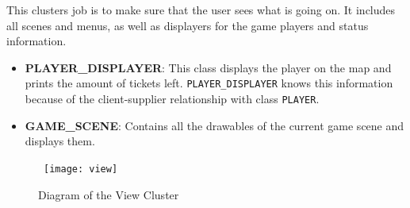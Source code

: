  This clusters job is to make sure that the user sees what is going on. It includes all scenes and menus, as well as displayers for the game players and status information.

\begin{itemize}
  \item{\textbf{PLAYER\_DISPLAYER}: This class displays the player on the map and prints the amount of tickets left. \texttt{PLAYER\_DISPLAYER} knows this information because of the client-supplier relationship with class \texttt{PLAYER}.}
  \item{\textbf{GAME\_SCENE}: Contains all the drawables of the current game scene and displays them.}
\end{itemize}

\begin{figure}[h]
\centerline{\hbox{  
  \texttt{[image: view]}
  }}
\caption{Diagram of the View Cluster}
\label{viewdiagram}
\end{figure}
